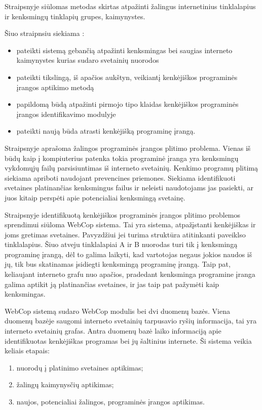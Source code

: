 Straipsnyje  siūlomas  metodas skirtas atpažinti žalingus internetinius tinklalapius ir kenksmingų tinklapių grupes, kaimynystes.

Šiuo straipnsiu siekiama \cite{webcop}:
    \begin{itemize}
        \item pateikti sistemą gebančią atpažinti kenksmingas bei saugias interneto kaimynystes kurias sudaro svetainių nuorodos
         \item pateikti tikslingą, iš apačios aukštyn, veikiantį kenkėjiškos programinės įrangos aptikimo metodą
         \item papildomą būdą atpažinti pirmojo tipo klaidas kenkėjiškos programinės įrangos identifikavimo modulyje
         \item pateikti naują būda atrasti kenkėjišką programinę įrangą.
    \end{itemize}

Straipsnyje aprašoma žalingos programinės įrangos plitimo problema. Vienas iš būdų kaip į kompiuterius patenka  tokia programinė įranga yra kenksmingų vykdomųjų failų parsisiuntimas iš interneto svetainių. Kenkimo programų plitimą siekiama apriboti naudojant prevencines priemones. Siekiama identifikuoti svetaines platinančias kenksmingus failus ir neleisti naudotojams jas pasiekti, ar juos kitaip perspėti apie potencialiai kenksmingą svetainę.

Straipsnyje identifikuotą kenkėjiškos programinės įrangos plitimo problemos sprendimui siūloma WebCop sistema. Tai yra sistema, atpažįstanti kenkėjiškas ir joms gretimas svetaines. Pavyzdžiui jei turima struktūra atitinkanti paveiklso  tinklalapius. Šiuo atveju tinklalapiai A ir B nuorodas turi tik į kenksmingą programinę įrangą, dėl to galima laikyti, kad vartotojas negaus jokios naudos iš jų, tik bus skatinamas įsidiegti kenksmingą programinę įrangą. Taip pat, keliaujant interneto grafu nuo apačios, pradedant kenksminga programine įranga galima aptikit ją platinančias svetaines, ir jas taip pat pažymėti kaip kenksmingas.


WebCop sistemą sudaro WebCop modulis bei dvi duomenų bazės. Viena duomenų bazėje saugomi interneto svetainių tarpusavio ryšių informacija, tai yra interneto svetainių grafas. Antra duomenų bazė laiko informaciją apie identifikuotas kenkėjiškas programas bei jų šaltinius internete. Ši sistema veikia keliais etapais:
    \begin{enumerate}[label=\arabic*.]
        \item nuorodų į platinimo svetaines aptikimas;
        \item žalingų kaimynysčių aptikimas;
        \item naujos, potencialiai žalingos, programinės įrangos aptikimas.
    \end{enumerate}

